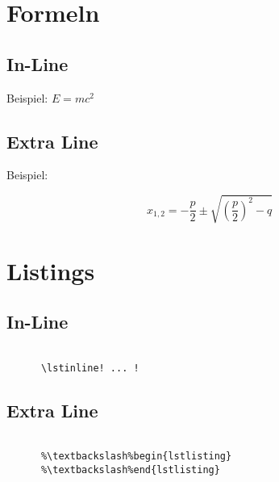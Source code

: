 \section{Formeln}

  \subsection{In-Line}
  \begin{frame}{\subsecname}

    Beispiel: \( E = mc^2 \)
  
  \end{frame}
  
  \subsection{Extra Line}
  \begin{frame}{\subsecname}

    Beispiel:

    \begin{equation*}
      x_{1,2} = -\frac{p}{2} \pm \sqrt{ \left( \frac{p}{2} \right)^2 - q }
    \end{equation*}

  \end{frame}

\section{Listings}

  \subsection{In-Line}
  \begin{frame}[fragile]{\subsecname}

    \begin{lstlisting}[gobble=6]
      % Option [fragile] ist erforderlich!

      \lstinline! ... !
    \end{lstlisting}

  \end{frame}

  \subsection{Extra Line}
  \begin{frame}[fragile]{\subsecname}

    \begin{lstlisting}[gobble=6,escapechar=\%]
      %\%% Option [fragile] ist erforderlich!

      %\textbackslash%begin{lstlisting}
      %\textbackslash%end{lstlisting}
    \end{lstlisting}

  \end{frame}

